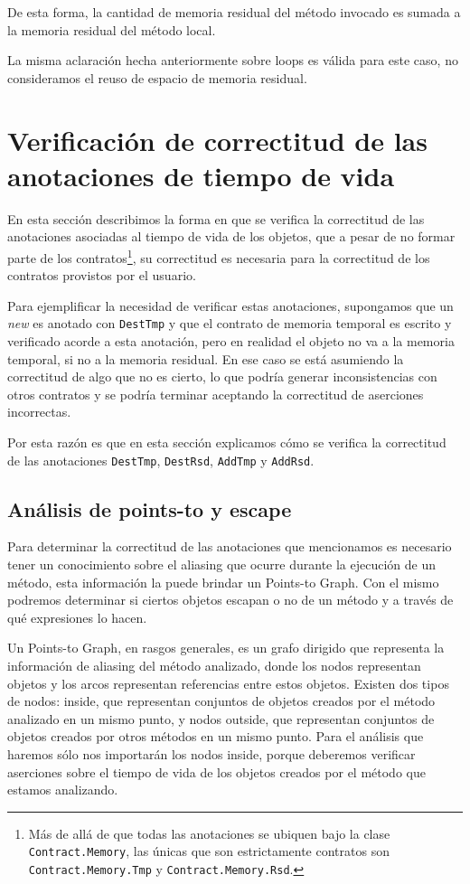 \documentclass[12pt,a4paper]{article}
\newcommand\mono[1]{\texttt{#1}}
\begin{document}
				De esta forma, la cantidad de memoria residual del método invocado es sumada a la memoria residual del método local.

				La misma aclaración hecha anteriormente sobre loops es válida para este caso, no consideramos el reuso de espacio de memoria residual.
	\newpage
	\section{Verificación de correctitud de las anotaciones de tiempo de vida} \label{sec:verifcorr}
		En esta sección describimos la forma en que se verifica la correctitud de las anotaciones asociadas al tiempo de vida de los objetos, que a pesar de no formar parte de los contratos\footnote{Más de allá de que todas las anotaciones se ubiquen bajo la clase \mono{Contract.Memory}, las únicas que son estrictamente contratos son \mono{Contract.Memory.Tmp} y \mono{Contract.Memory.Rsd}.}, su correctitud es necesaria para la correctitud de los contratos provistos por el usuario.

		Para ejemplificar la necesidad de verificar estas anotaciones, supongamos que un \textit{new} es anotado con \mono{DestTmp} y que el contrato de memoria temporal es escrito y verificado acorde a esta anotación, pero en realidad el objeto no va a la memoria temporal, si no a la memoria residual. En ese caso se está asumiendo la correctitud de algo que no es cierto, lo que podría generar inconsistencias con otros contratos y se podría terminar aceptando la correctitud de aserciones incorrectas.

		Por esta razón es que en esta sección explicamos cómo se verifica la correctitud de las anotaciones \mono{DestTmp}, \mono{DestRsd}, \mono{AddTmp} y \mono{AddRsd}.

		\subsection{Análisis de points-to y escape}
			Para determinar la correctitud de las anotaciones que mencionamos es necesario tener un conocimiento sobre el aliasing que ocurre durante la ejecución de un método, esta información la puede brindar un Points-to Graph. Con el mismo podremos determinar si ciertos objetos escapan o no de un método y a través de qué expresiones lo hacen.

			Un Points-to Graph, en rasgos generales, es un grafo dirigido que representa la información de aliasing del método analizado, donde los nodos representan objetos y los arcos representan referencias entre estos objetos. Existen dos tipos de nodos: inside, que representan conjuntos de objetos creados por el método analizado en un mismo punto, y nodos outside, que representan conjuntos de objetos creados por otros métodos en un mismo punto. Para el análisis que haremos sólo nos importarán los nodos inside, porque deberemos verificar aserciones sobre el tiempo de vida de los objetos creados por el método que estamos analizando.
\end{document}
